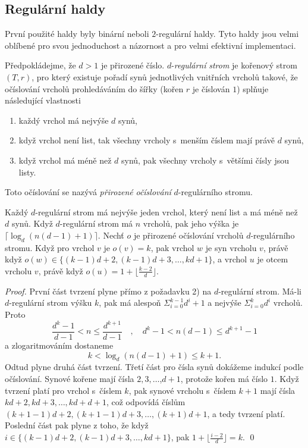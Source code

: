 \documentclass[a4paper,12pt]{article}
\begin{document}
\subsection{{Regulární haldy}}

První použité haldy byly binární neboli $
2$-regulární haldy. 
Tyto haldy jsou velmi oblíbené pro svou jednoduchost a 
názornost a pro velmi efektivní implementaci.

Předpokládejme, že $d>1$ je přirozené číslo. 
$d$-\emph{regulární} \emph{strom} je kořenový strom 
$(T,r)$, pro který existuje pořadí synů 
jednotlivých vnitřních vrcholů takové, že 
očíslování vrcholů pro\-hle\-dá\-váním do šířky 
(kořen $r$ je číslován $1$) splňuje následující vlastnosti
\begin{enumerate}
\item
každý vrchol má nejvýše $d$ synů,
\item
když vrchol není list, tak všechny vrcholy s~menším 
číslem mají právě $d$ synů,
\item
když vrchol má méně než $d$ synů, pak všechny 
vrcholy s~většími čísly jsou listy.
\end{enumerate}
Toto očíslování se nazývá \emph{přirozené} 
\emph{očíslování} $d$-regulárního stromu. 

\begin{tvrzeni}Každý $d$-regulární strom má nejvýše jeden 
vrchol, který není list a má méně než $d$ synů. Když 
$d$-regulární strom má $n$ vrcholů, pak jeho 
výška je $\lceil\log_d(n(d-1)+1)\rceil$. Nechť $o$ je přirozené očíslování 
vrcholů $d$-regulárního stromu. Když pro vrchol 
$v$ je $o(v)=k$, pak vrchol $w$ je syn vrcholu $v$, právě 
když $o(w)\in \{(k-1)d+2,(k-1)d+3,\dots,kd+1\}$, a vrchol $u$ je 
otcem vrcholu $v$, právě když $o(u)=1+\lfloor\frac {k-2}d
\rfloor$. 
\end{tvrzeni}

\begin{proof}První část tvrzení plyne přímo z požadavku 2) na 
$d$-regulární strom. Má-li $d$-regulární strom výšku $
k$, 
pak má alespoň $\Sigma_{i=0}^{k-1}d^i+1$ a nejvýše $\Sigma_{
i=0}^kd^i$ 
vrcholů. Proto
$$\frac {d^k-1}{d-1}<n\le\frac {d^{k+1}}{d-1}\quad ,\quad d^k-1<n
(d-1)\le d^{k+1}-1$$
a zlogaritmováním dostaneme
$$k<\log_d(n(d-1)+1)\le k+1.$$
Odtud plyne 
druhá část tvrzení.  Třetí část pro čísla synů dokážeme 
indukcí podle očíslová\-ní.  Synové kořene mají čísla 
$2,3,\dots$,$d+1$,  protože kořen má číslo $1$.  Když tvrzení platí 
pro vrchol s~číslem $k$, pak synové vrcholu s~číslem $
k+1$ 
mají čísla $kd+2,kd+3,\dots,kd+d+1$, což odpovídá 
číslům $(k+1-1)d+2,(k+1-1)d+3,\dots,(k+1)d+1$, a tedy 
tvrzení platí. Poslední část pak plyne z toho, že když $
i\in \{(k-1)d+2,(k-1)d+3,\dots,kd+1\}$, pak 
$1+\lfloor\frac {i-2}d\rfloor =k$. \qed
\end{proof}
\end{document}
